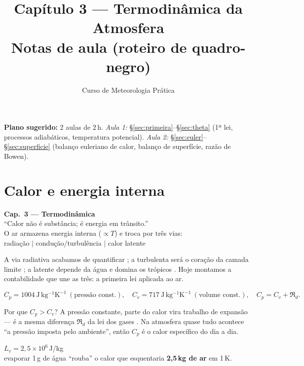 \documentclass[11pt]{article}
\title{Capítulo 3 --- Termodinâmica da Atmosfera\\
{\large Notas de aula (roteiro de quadro-negro)}}
\author{Curso de Meteorologia Prática}
\date{}
\begin{document}
\maketitle
\thispagestyle{fancy}

\noindent\textbf{Plano sugerido:} 2 aulas de 2\,h.
\emph{Aula 1:} \S\ref{sec:primeira}--\S\ref{sec:theta} (1ª lei, processos
adiabáticos, temperatura potencial).
\emph{Aula 2:} \S\ref{sec:euler}--\S\ref{sec:superficie} (balanço euleriano
de calor, balanço de superfície, razão de Bowen).

\section{Calor e energia interna}

\begin{noquadro}[abertura]
\textbf{Cap.~3 --- Termodinâmica}\\[2pt]
``Calor não é substância; é energia em trânsito.''\\[2pt]
O ar armazena energia interna ($\propto T$) e troca por três vias:\\
radiação \quad $|$ \quad condução/turbulência \quad $|$ \quad calor latente
\end{noquadro}

A via radiativa acabamos de quantificar ;
a turbulenta será o coração da camada limite ; a latente depende da água e domina os trópicos
 . Hoje montamos a
contabilidade que une as três: a primeira lei aplicada ao ar.

\begin{formalivro}
\[ C_p = 1004\ \mathrm{J\,kg^{-1}K^{-1}}\ (\text{pressão const.}),\quad
   C_v = 717\ \mathrm{J\,kg^{-1}K^{-1}}\ (\text{volume const.}),\quad
   C_p = C_v + \Re_d. \]
\end{formalivro}

Por que $C_p > C_v$? A pressão constante, parte do calor vira trabalho de
expansão — é a mesma diferença $\Re_d$ da lei dos gases
. Na atmosfera quase tudo acontece ``a pressão
imposta pelo ambiente'', então $C_p$ é o calor específico do dia a dia.

\begin{noquadro}
$L_v = 2{,}5\times10^{6}$\,J/kg\\[2pt]
evaporar 1\,g de água ``rouba'' o calor que esquentaria
\textbf{2{,}5\,kg de ar} em 1\,K.
\end{noquadro}
\end{document}
